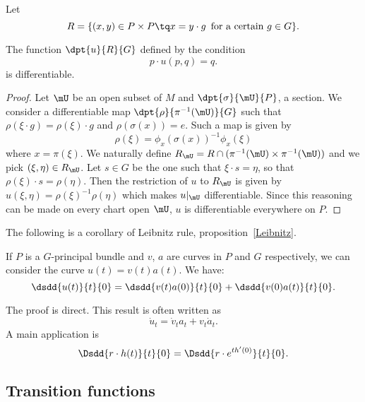 Let
\[
	R=\{ (x,y)\in P\times P\tq x=y\cdot g\,\textrm{ for a certain $g\in G$}  \}.
\]

\begin{proposition}
	The function $\dpt{u}{R}{G}$ defined by the condition
	\[
		p\cdot u(p,q)=q.
	\]
	is differentiable.
\end{proposition}

\begin{proof}
	Let $\mU$ be an open subset of $M$ and $\dpt{\sigma}{\mU}{P}$, a section. We consider a differentiable map $\dpt{\rho}{\pi^{-1}(\mU)}{G}$ such that $\rho(\xi\cdot g)=\rho(\xi)\cdot g$ and $\rho(\sigma(x))=e$. Such a map is given by
	\[
		\rho(\xi)=\phi_x(\sigma(x))^{-1}\phi_x(\xi)
	\]
	where $x=\pi(\xi)$. We naturally define $R_{\mU}=R\cap( \pi^{-1}(\mU)\times\pi^{-1}(\mU) )$ and we pick $(\xi,\eta)\in R_{\mU}$. Let $s\in G$ be the one such that $\xi\cdot s=\eta$, so that $\rho(\xi)\cdot s=\rho(\eta)$. Then the restriction of $u$ to $R_{\mU}$ is given by $u(\xi,\eta)=\rho(\xi)^{-1}\rho(\eta)$ which makes $u|_{\mU}$ differentiable. Since this reasoning can be made on every chart open $\mU$, $u$ is differentiable everywhere on $P$.
\end{proof}

The following is a corollary of Leibnitz rule, proposition~\ref{Leibnitz}.
\begin{corollary}  \label{cor_PrincLeib}
	If $P$ is a $G$-principal bundle and $v$, $a$ are curves in $P$ and $G$ respectively, we can consider the curve $u(t)=v(t)a(t)$. We have:
	\[
		\dsdd{u(t)}{t}{0}=\dsdd{v(t)a(0)}{t}{0}+\dsdd{v(0)a(t)}{t}{0}.
	\]
\end{corollary}
The proof is direct. This result is often written as
\begin{equation}
	\dot{u}_t=\dot{v}_ta_t+v_t\dot{a}_t.
\end{equation}
A main application is
\begin{equation}\label{eq:rdotht}
	\Dsdd{ r\cdot h(t) }{t}{0}=\Dsdd{r\cdot e^{th'(0)}}{t}{0}.
\end{equation}

\subsection{Transition functions}


